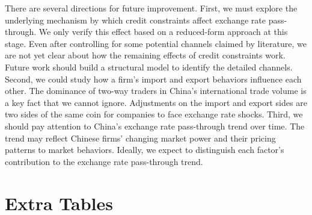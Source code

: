 \documentclass[12pt]{article}
\begin{document}
There are several directions for future improvement. First, we must explore the underlying mechanism by which credit constraints affect exchange rate pass-through. We only verify this effect based on a reduced-form approach at this stage. Even after controlling for some potential channels claimed by literature, we are not yet clear about how the remaining effects of credit constraints work. Future work should build a structural model to identify the detailed channels. Second, we could study how a firm's import and export behaviors influence each other. The dominance of two-way traders in China's international trade volume is a key fact that we cannot ignore. Adjustments on the import and export sides are two sides of the same coin for companies to face exchange rate shocks. Third, we should pay attention to China's exchange rate pass-through trend over time. The trend may reflect Chinese firms' changing market power and their pricing patterns to market behaviors. Ideally, we expect to distinguish each factor's contribution to the exchange rate pass-through trend. 

\newpage 


\appendix

\newpage

\section{Extra Tables}\label{Appendix-Tables}

\setcounter{table}{0}

\renewcommand{\thetable}{A\arabic{table}}
\end{document}
